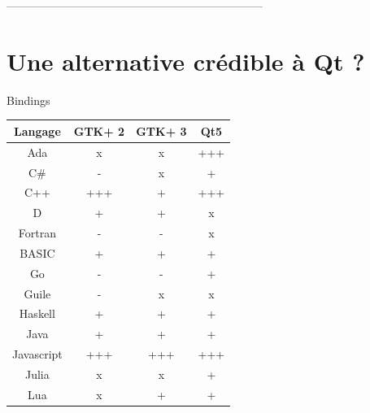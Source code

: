 \documentclass{beamer}
\begin{document}
--------------------------------------------------------------------
\section{Une alternative crédible à Qt ?}
\def \official{+++\cellcolor{green}}
\def \supported{+\cellcolor{green!50}}
\def \partially{-\cellcolor{blue}}
\def \unsupported{x\cellcolor{red}}

\begin{frame}{Bindings}
	\begin{table}[H]
\centering
	\begin{tabular}{| c | c | c | c |} \hline
    	Langage & GTK+ 2 & GTK+ 3 & Qt5 \\ \hline
        
        Ada & \unsupported & \unsupported & \official \\ \hline
        C\# & \partially & \unsupported & \supported \\ \hline
        C++ & \official & \supported  & \official \\ \hline
        D & \supported & \supported & \unsupported \\ \hline
        Fortran & \partially & \partially & \unsupported \\ \hline
        BASIC & \supported  & \supported & \supported \\ \hline
        Go & \partially & \partially & \supported \\ \hline
        Guile & \partially & \unsupported & \unsupported \\ \hline
        Haskell & \supported & \supported & \supported \\ \hline
        Java & \supported & \supported & \supported \\ \hline
        Javascript & \official & \official & \official \\ \hline
        Julia & \unsupported & \unsupported &\supported \\ \hline
        Lua & \unsupported & \supported & \supported \\  \hline
        
        
    \end{tabular}
\end{table}
    
\end{frame}
\end{document}
